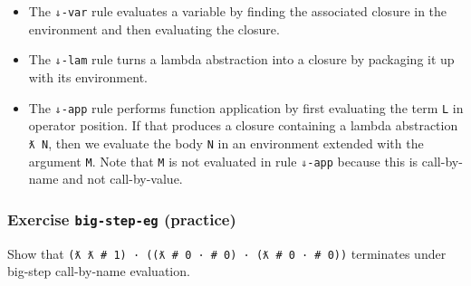 \begin{fence}
\begin{code}
\AgdaSpace{}%
\AgdaSpace{}%
\AgdaSymbol{)}\AgdaSpace{}%
\AgdaSpace{}%
\AgdaSpace{}%
\AgdaSpace{}%
\<%
\\
\>[.][@{}l@{}]\<[204I]%
\>[6]\AgdaComment{---------------------------------------------------}\<%
\\
%
\>[4]\AgdaSpace{}%
\AgdaSpace{}%
\AgdaSpace{}%
\AgdaSpace{}%
\AgdaSpace{}%
\AgdaSpace{}%
\AgdaSpace{}%
\<%
\end{code}
\end{fence}

\begin{itemize}
\item
  The \texttt{⇓-var} rule evaluates a variable by finding the associated
  closure in the environment and then evaluating the closure.
\item
  The \texttt{⇓-lam} rule turns a lambda abstraction into a closure by
  packaging it up with its environment.
\item
  The \texttt{⇓-app} rule performs function application by first
  evaluating the term \texttt{L} in operator position. If that produces
  a closure containing a lambda abstraction \texttt{ƛ\ N}, then we
  evaluate the body \texttt{N} in an environment extended with the
  argument \texttt{M}. Note that \texttt{M} is not evaluated in rule
  \texttt{⇓-app} because this is call-by-name and not call-by-value.
\end{itemize}

\hypertarget{exercise-big-step-eg-practice}{%
\subsubsection{\texorpdfstring{Exercise \texttt{big-step-eg}
(practice)}{Exercise big-step-eg (practice)}}\label{exercise-big-step-eg-practice}}

Show that
\texttt{(ƛ\ ƛ\ \#\ 1)\ ·\ ((ƛ\ \#\ 0\ ·\ \#\ 0)\ ·\ (ƛ\ \#\ 0\ ·\ \#\ 0))}
terminates under big-step call-by-name evaluation.

\begin{fence}
\begin{code}%
\>[0]\<%
\end{code}
\end{fence}

